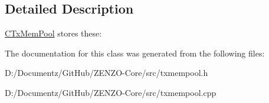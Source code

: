 \subsection{Detailed Description}
\mbox{\hyperlink{class_c_tx_mem_pool}{C\+Tx\+Mem\+Pool}} stores these\+: 

The documentation for this class was generated from the following files\+:\begin{DoxyCompactItemize}
\item 
D\+:/\+Documentz/\+Git\+Hub/\+Z\+E\+N\+Z\+O-\/\+Core/src/txmempool.\+h\item 
D\+:/\+Documentz/\+Git\+Hub/\+Z\+E\+N\+Z\+O-\/\+Core/src/txmempool.\+cpp\end{DoxyCompactItemize}
